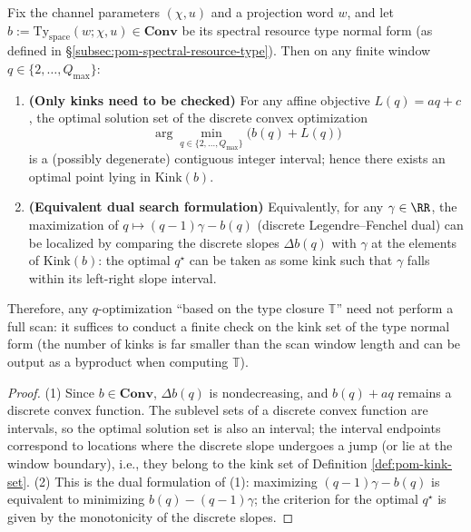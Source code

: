 \begin{proposition}\label{prop:pom-kink-principle-q-selection}
Fix the channel parameters \((\chi,u)\) and a projection word \(w\), and let
\(
b:=\mathrm{Ty}_{\mathrm{space}}(w;\chi,u)\in\mathbf{Conv}
\)
be its spectral resource type normal form (as defined in \S\ref{subsec:pom-spectral-resource-type}).
Then on any finite window \(q\in\{2,\dots,Q_{\max}\}\):
\begin{enumerate}
  \item \textbf{(Only kinks need to be checked)} For any affine objective \(L(q)=aq+c\), the optimal solution set of the discrete convex optimization
  \[
  \arg\min_{q\in\{2,\dots,Q_{\max}\}}\bigl(b(q)+L(q)\bigr)
  \]
  is a (possibly degenerate) contiguous integer interval; hence there exists an optimal point lying in \(\mathrm{Kink}(b)\).
  \item \textbf{(Equivalent dual search formulation)} Equivalently, for any \(\gamma\in\RR\), the maximization of
  \(
  q\mapsto (q-1)\gamma-b(q)
  \)
  (discrete Legendre--Fenchel dual) can be localized by comparing the discrete slopes \(\Delta b(q)\) with \(\gamma\) at the elements of \(\mathrm{Kink}(b)\): the optimal \(q^\star\) can be taken as some kink such that \(\gamma\) falls within its left-right slope interval.
\end{enumerate}
Therefore, any \(q\)-optimization ``based on the type closure \(\mathbb{T}\)'' need not perform a full scan: it suffices to conduct a finite check on the kink set of the type normal form (the number of kinks is far smaller than the scan window length and can be output as a byproduct when computing \(\mathbb{T}\)).
\end{proposition}

\begin{proof}
(1) Since \(b\in\mathbf{Conv}\), \(\Delta b(q)\) is nondecreasing, and \(b(q)+aq\) remains a discrete convex function.
The sublevel sets of a discrete convex function are intervals, so the optimal solution set is also an interval; the interval endpoints correspond to locations where the discrete slope undergoes a jump (or lie at the window boundary), i.e., they belong to the kink set of Definition \ref{def:pom-kink-set}.
(2) This is the dual formulation of (1): maximizing \((q-1)\gamma-b(q)\) is equivalent to minimizing \(b(q)-(q-1)\gamma\); the criterion for the optimal \(q^\star\) is given by the monotonicity of the discrete slopes.
\end{proof}

